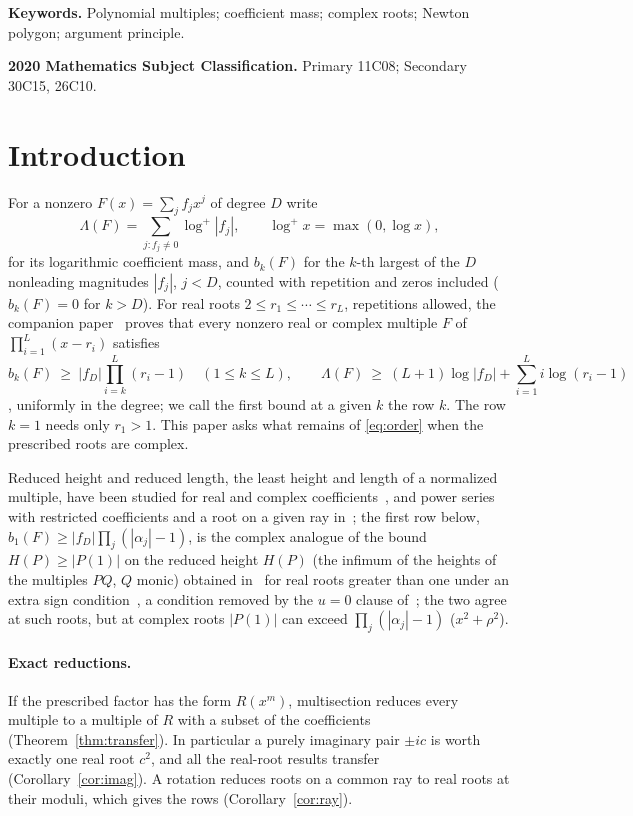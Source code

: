 \documentclass[11pt]{article}
\begin{document}
\noindent\textbf{Keywords.} Polynomial multiples; coefficient mass; complex
roots; Newton polygon; argument principle.

\noindent\textbf{2020 Mathematics Subject Classification.} Primary 11C08; Secondary 30C15, 26C10.

\section{Introduction}

For a nonzero $F(x)=\sum_jf_jx^j$ of degree $D$ write
\[
  \Lambda(F)=\sum_{j:f_j\ne0}\log^+|f_j|,\qquad \log^+x=\max(0,\log x),
\]
for its logarithmic coefficient mass, and $b_k(F)$ for the $k$-th largest of
the $D$ nonleading magnitudes $|f_j|$, $j<D$, counted with repetition and
zeros included ($b_k(F)=0$ for $k>D$).  For real roots
$2\le r_1\le\cdots\le r_L$, repetitions allowed, the companion
paper~\cite{coefficient-mass} proves that every nonzero real or complex
multiple $F$ of $\prod_{i=1}^L(x-r_i)$ satisfies
\begin{equation}\label{eq:order}
  b_k(F)\ \ge\ |f_D|\prod_{i=k}^L(r_i-1)\quad(1\le k\le L),
  \qquad
  \Lambda(F)\ \ge\ (L+1)\log|f_D|+\sum_{i=1}^Li\log(r_i-1)
\end{equation}
\cite[Theorem~3.2, Corollaries~3.3 and~3.4]{coefficient-mass}, uniformly in
the degree; we call the first bound at a given $k$ the row $k$.  The row
$k=1$ needs only $r_1>1$.  This paper asks what remains of
\eqref{eq:order} when the prescribed roots are complex.

Reduced height and reduced length, the least height and length of a
normalized multiple, have been studied for real and complex
coefficients~\cite{dj,schinzel-complex}, and power series with restricted
coefficients and a root on a given ray in~\cite{bbbp-ray}; the first row
below, $b_1(F)\ge|f_D|\prod_j(|\alpha_j|-1)$, is the complex analogue of the
bound $H(P)\ge|P(1)|$ on the reduced height $H(P)$ (the infimum of the
heights of the multiples $PQ$, $Q$ monic) obtained in~\cite{dj} for real roots
greater than one under an extra sign condition~\cite[p.~333]{dj}, a
condition removed by the $u=0$ clause of~\cite[Theorem~3.2]{coefficient-mass};
the two agree at such roots, but at complex
roots $|P(1)|$ can exceed $\prod_j(|\alpha_j|-1)$ ($x^2+\rho^2$).

\paragraph{Exact reductions.}  If the prescribed factor has the form
$R(x^m)$, multisection reduces every multiple to a multiple of $R$ with a
subset of the coefficients (Theorem~\ref{thm:transfer}).  In particular a
purely imaginary pair $\pm ic$ is worth exactly one real root $c^2$, and all
the real-root results transfer (Corollary~\ref{cor:imag}).  A rotation
reduces roots on a common ray to real roots at their moduli, which gives the
rows (Corollary~\ref{cor:ray}).
\end{document}

